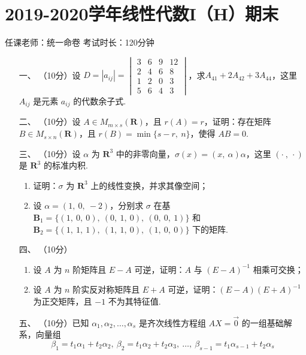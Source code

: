 \section*{2019-2020学年线性代数I（H）期末}

\begin{center}
    任课老师：统一命卷\hspace{4em} 考试时长：120分钟
\end{center}

\begin{enumerate}
	\item[一、]（10分）设 $D=|a_{ij}|=\begin{vmatrix}3 & 6 & 9 & 12 \\ 2 & 4 & 6 & 8 \\1 & 2 & 0 & 3 \\ 5 & 6 & 4 & 3\end{vmatrix}$，求$A_{41}+2A_{42}+3A_{44}$，这里 $A_{ij}$ 是元素 $a_{ij}$ 的代数余子式.
	\item[二、]（10分）设 $A \in M_{m \times s}(\mathbf{R})$，且 $r(A)=r$，证明：存在矩阵 $B \in M_{s \times n}(\mathbf{R})$，且 $r(B)=\min\{s-r,\ n\}$，使得 $AB=0$.
	\item[三、]（10分）设 $\alpha$ 为 $\mathbf{R}^3$ 中的非零向量，$\sigma(x)=(x,\ \alpha)\alpha$，这里 $(\cdot\ ,\ \cdot)$ 是 $\mathbf{R}^3$ 的标准内积.
    \begin{enumerate}[label=(\arabic*)]
        \item 证明：$\sigma$ 为 $\mathbf{R}^3$ 上的线性变换，并求其像空间；
        \item 设 $\alpha=(1,\ 0,\ -2)$，分别求 $\sigma$ 在基 $\mathbf{B}_1=\{(1,\ 0,\ 0),\ (0,\ 1,\ 0),\ (0,\ 0,\ 1)\}$ 和 $\mathbf{B}_2=\{(1,\ 1,\ 1),\ (1,\ 1,\ 0),\ (1,\ 0,\ 0)\}$ 下的矩阵.
    \end{enumerate}
	\item[四、]（10分）
    \begin{enumerate}[label=(\arabic*)]
        \item 设 $A$ 为 $n$ 阶矩阵且 $E-A$ 可逆，证明：$A$ 与 $(E-A)^{-1}$ 相乘可交换；
        \item 设 $A$ 为 $n$ 阶实反对称矩阵且 $E+A$ 可逆，证明：$(E-A)(E+A)^{-1}$ 为正交矩阵，且 $-1$ 不为其特征值.
    \end{enumerate}
	\item[五、]（10分）已知 $\alpha_1,\alpha_2,\ldots,\alpha_s$ 是齐次线性方程组 $AX=\vec{0}$ 的一组基础解系，向量组
    \[\beta_1=t_1\alpha_1+t_2\alpha_2,\ \beta_2=t_1\alpha_2+t_2\alpha_3,\ \ldots,\ \beta_{s-1}=t_1\alpha_{s-1}+t_2\alpha_s\]

\end{enumerate}
